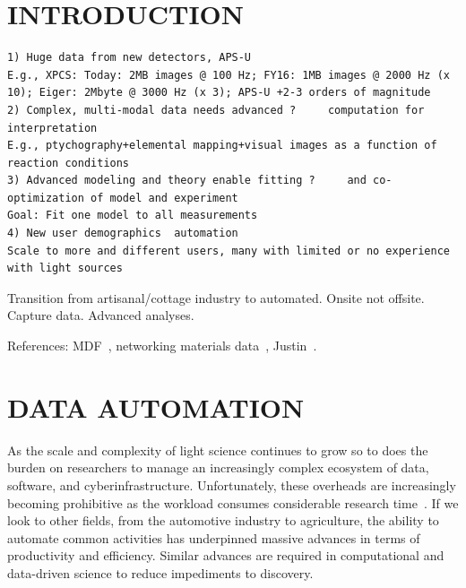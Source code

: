 \documentclass{aip-cp}
\newcommand\ian[1]{}
\newcommand\ian[1]{{\color{red}[Ian: #1]}}
\begin{document}
\ian{Potential authors: Tekin Bicer, Ben Blaiszik, Kyle Chard, Ryan Chard, Logan Ward, Justin Wozniak, ...}


\section{INTRODUCTION}

\ian{Introductory material on challenges at light sources.}

\begin{verbatim}
1) Huge data from new detectors, APS-U
E.g., XPCS: Today: 2MB images @ 100 Hz; FY16: 1MB images @ 2000 Hz (x 10); Eiger: 2Mbyte @ 3000 Hz (x 3); APS-U +2-3 orders of magnitude
2) Complex, multi-modal data needs advanced ?     computation for interpretation
E.g., ptychography+elemental mapping+visual images as a function of reaction conditions
3) Advanced modeling and theory enable fitting ?     and co-optimization of model and experiment
Goal: Fit one model to all measurements
4) New user demographics  automation
Scale to more and different users, many with limited or no experience with light sources
\end{verbatim}

Transition from artisanal/cottage industry to automated. Onsite not offsite. Capture data. Advanced analyses.



References: MDF~\cite{MDF2016}, networking materials data~\cite{foster2015networking}, Justin~\cite{wozniak2015big}.


\section{DATA AUTOMATION}

\ian{Big picture thoughts I guess.}

As the scale and complexity of light science continues to grow so to does the burden on
researchers to manage an increasingly complex ecosystem of data, software, and cyberinfrastructure. 
Unfortunately, these overheads are increasingly becoming prohibitive as the workload consumes
considerable research time~\cite{}. If we look to other fields, from the automotive industry
to agriculture, the ability to automate common activities has underpinned massive advances
in terms of productivity and efficiency. Similar advances are required in computational
and data-driven science to reduce impediments to discovery. 

\end{document}
